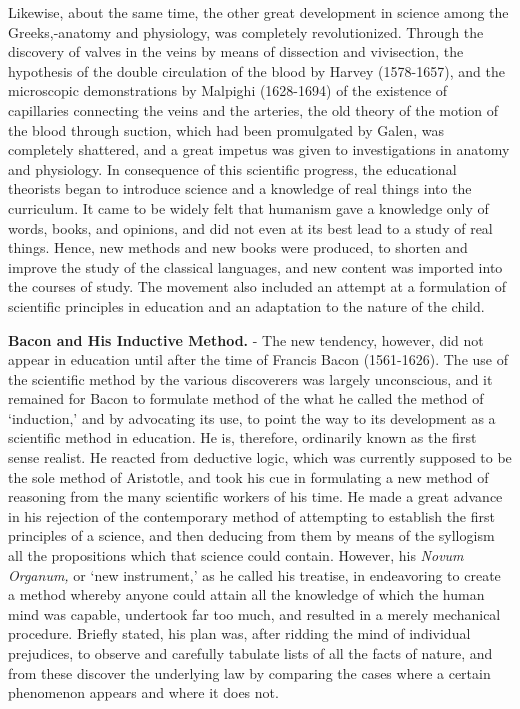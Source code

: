 \documentclass[
]{book}
\begin{document}
Likewise, about the same time, the other great development in science among the Greeks,-anatomy and physiology, was completely revolutionized. Through the discovery of valves in the veins by means of dissection and vivisection, the hypothesis of the double circulation of the blood by Harvey (1578-1657), and the microscopic demonstrations by Malpighi (1628-1694) of the existence of capillaries connecting the veins and the arteries, the old theory of the motion of the blood through suction, which had been promulgated by Galen, was completely shattered, and a great impetus was given to investigations in anatomy and physiology. In consequence of this scientific progress, the educational theorists began to introduce science and a knowledge of real things into the curriculum. It came to be widely felt that humanism gave a knowledge only of words, books, and opinions, and did not even at its best lead to a study of real things. Hence, new methods and new books were produced, to shorten and improve the study of the classical languages, and new content was imported into the courses of study. The movement also included an attempt at a formulation of scientific principles in education and an adaptation to the nature of the child.

\textbf{Bacon and His Inductive Method.} - The new tendency, however, did not appear in education until after the time of Francis Bacon (1561-1626). The use of the scientific method by the various discoverers was largely unconscious, and it remained for Bacon to formulate method of the what he called the method of `induction,' and by advocating its use, to point the way to its development as a scientific method in education. He is, therefore, ordinarily known as the first sense realist. He reacted from deductive logic, which was currently supposed to be the sole method of Aristotle, and took his cue in formulating a new method of reasoning from the many scientific workers of his time. He made a great advance in his rejection of the contemporary method of attempting to establish the first principles of a science, and then deducing from them by means of the syllogism all the propositions which that science could contain. However, his \emph{Novum Organum,} or `new instrument,' as he called his treatise, in endeavoring to create a method whereby anyone could attain all the knowledge of which the human mind was capable, undertook far too much, and resulted in a merely mechanical procedure. Briefly stated, his plan was, after ridding the mind of individual prejudices, to observe and carefully tabulate lists of all the facts of nature, and from these discover the underlying law by comparing the cases where a certain phenomenon appears and where it does not.
\end{document}
